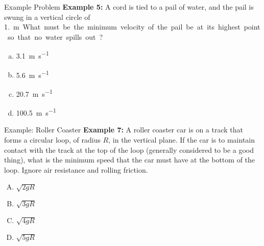 \documentclass[12pt,compress,aspectratio=169]{beamer}
\begin{document}
\begin{frame}{Example Problem}
  \textbf{Example 5:} A cord is tied to a pail of water, and the pail is swung
  in a vertical circle of \SI{1.}\metre. What must be the minimum velocity of
  the pail be at its highest point so that no water spills out?
  \begin{enumerate}[a.]
  \item\SI{3.1}{\metre\per\second}
  \item\SI{5.6}{\metre\per\second}
  \item\SI{20.7}{\metre\per\second}
  \item\SI{100.5}{\metre\per\second}
  \end{enumerate}
\end{frame}



\begin{frame}{Example: Roller Coaster}
  \textbf{Example 7:} A roller coaster car is on a track that forms a circular
  loop, of radius $R$, in the vertical plane. If the car is to maintain contact
  with the track at the top of the loop (generally considered to be a good
  thing), what is the minimum speed that the car must have at the bottom of the
  loop. Ignore air resistance and rolling friction.
  \begin{enumerate}[A.]
  \item $\sqrt{2gR}$
  \item $\sqrt{3gR}$
  \item $\sqrt{4gR}$
  \item $\sqrt{5gR}$
  \end{enumerate}
\end{frame}



\end{document}
